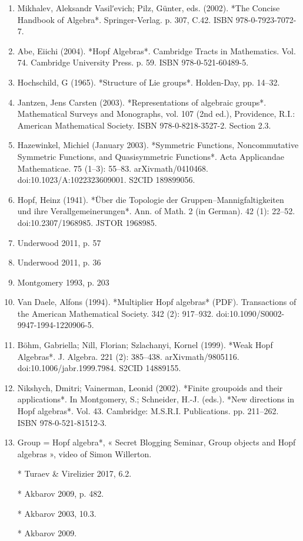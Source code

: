 \begin{enumerate}
\item Mikhalev, Aleksandr Vasilʹevich; Pilz, Günter, eds. (2002). *The Concise Handbook of Algebra*. Springer-Verlag. p. 307, C.42. ISBN 978-0-7923-7072-7.



\item Abe, Eiichi (2004). *Hopf Algebras*. Cambridge Tracts in Mathematics. Vol. 74. Cambridge University Press. p. 59. ISBN 978-0-521-60489-5.

\item Hochschild, G (1965). *Structure of Lie groups*. Holden-Day, pp. 14–32.

\item Jantzen, Jens Carsten (2003). *Representations of algebraic groups*. Mathematical Surveys and Monographs, vol. 107 (2nd ed.), Providence, R.I.: American Mathematical Society. ISBN 978-0-8218-3527-2. Section 2.3.

\item Hazewinkel, Michiel (January 2003). *Symmetric Functions, Noncommutative Symmetric Functions, and Quasisymmetric Functions*. Acta Applicandae Mathematicae. 75 (1–3): 55–83. arXiv\:math/0410468. doi:10.1023/A:1022323609001. S2CID 189899056.

\item Hopf, Heinz (1941). *Über die Topologie der Gruppen–Mannigfaltigkeiten und ihre Verallgemeinerungen*. Ann. of Math. 2 (in German). 42 (1): 22–52. doi:10.2307/1968985. JSTOR 1968985.

\item Underwood 2011, p. 57

\item Underwood 2011, p. 36

\item Montgomery 1993, p. 203

\item Van Daele, Alfons (1994). *Multiplier Hopf algebras* (PDF). Transactions of the American Mathematical Society. 342 (2): 917–932. doi:10.1090/S0002-9947-1994-1220906-5.

\item Böhm, Gabriella; Nill, Florian; Szlachanyi, Kornel (1999). *Weak Hopf Algebras*. J. Algebra. 221 (2): 385–438. arXiv\:math/9805116. doi:10.1006/jabr.1999.7984. S2CID 14889155.

\item Nikshych, Dmitri; Vainerman, Leonid (2002). *Finite groupoids and their applications*. In Montgomery, S.; Schneider, H.-J. (eds.). *New directions in Hopf algebras*. Vol. 43. Cambridge: M.S.R.I. Publications. pp. 211–262. ISBN 978-0-521-81512-3.

\item Group = Hopf algebra*, « Secret Blogging Seminar, Group objects and Hopf algebras », video of Simon Willerton.

* Turaev & Virelizier 2017, 6.2.

* Akbarov 2009, p. 482.

* Akbarov 2003, 10.3.

* Akbarov 2009.

\end{enumerate}